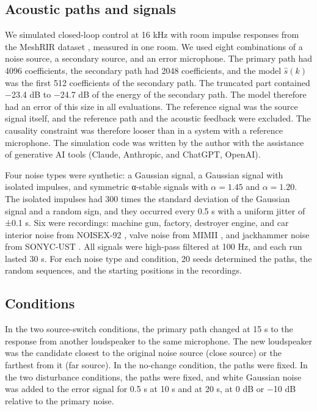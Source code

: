\documentclass[sip,biber]{now-journal}
\begin{document}
\hypertarget{sec:5.1}{%
\subsection{Acoustic paths and signals}\label{sec:5.1}}

We simulated closed-loop control at 16 kHz with room impulse responses from the MeshRIR dataset \cite{meshrir}, measured in one room. We used eight combinations of a noise source, a secondary source, and an error microphone. The primary path had 4096 coefficients, the secondary path had 2048 coefficients, and the model \(\hat{s}(k)\) was the first 512 coefficients of the secondary path. The truncated part contained −23.4 dB to −24.7 dB of the energy of the secondary path. The model therefore had an error of this size in all evaluations. The reference signal was the source signal itself, and the reference path and the acoustic feedback were excluded. The causality constraint was therefore looser than in a system with a reference microphone. The simulation code was written by the author with the assistance of generative AI tools (Claude, Anthropic, and ChatGPT, OpenAI).

Four noise types were synthetic: a Gaussian signal, a Gaussian signal with isolated impulses, and symmetric α-stable signals with \(\alpha = 1.45\) and \(\alpha = 1.20\). The isolated impulses had 300 times the standard deviation of the Gaussian signal and a random sign, and they occurred every 0.5 s with a uniform jitter of ±0.1 s. Six were recordings: machine gun, factory, destroyer engine, and car interior noise from NOISEX-92 \cite{noisex}, valve noise from MIMII \cite{mimii}, and jackhammer noise from SONYC-UST \cite{sonyc}. All signals were high-pass filtered at 100 Hz, and each run lasted 30 s. For each noise type and condition, 20 seeds determined the paths, the random sequences, and the starting positions in the recordings.

\hypertarget{sec:5.2}{%
\subsection{Conditions}\label{sec:5.2}}

In the two source-switch conditions, the primary path changed at 15 s to the response from another loudspeaker to the same microphone. The new loudspeaker was the candidate closest to the original noise source (close source) or the farthest from it (far source). In the no-change condition, the paths were fixed. In the two disturbance conditions, the paths were fixed, and white Gaussian noise was added to the error signal for 0.5 s at 10 s and at 20 s, at 0 dB or −10 dB relative to the primary noise.
\end{document}
